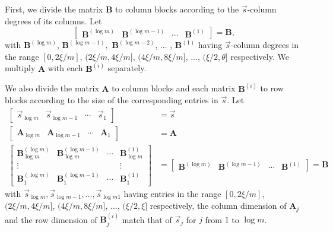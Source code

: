 \begin{pf}
First, we divide the matrix $\mathbf{B}$ to column blocks according
to the $\vec{s}$-column degrees of its columns. Let 
\[
\left[\begin{array}{cccc}
\mathbf{B}^{\left(\log m\right)} & \mathbf{B}^{\left(\log m-1\right)} & \cdots & \mathbf{B}^{\left(1\right)}\end{array}\right]=\mathbf{B},
\]
with $\mathbf{B}^{\left(\log m\right)}$, $\mathbf{B}^{\left(\log m-1\right)},$
$\mathbf{B}^{\left(\log m-2\right)}$, ... , $\mathbf{B}^{\left(1\right)}$
having $\vec{s}$-column degrees in the range $\left[0,2\xi/m\right]$,
$(2\xi/m,4\xi/m]$, $(4\xi/m,8\xi/m]$, ..., $(\xi/2,\theta]$ respectively.
We multiply $\mathbf{A}$ with each $\mathbf{B}^{\left(i\right)}$
separately. 

We also divide the matrix $\mathbf{A}$ to column blocks and each
matrix $\mathbf{B}^{\left(i\right)}$ to row blocks according to the
size of the corresponding entries in $\vec{s}$. Let 
\begin{align*}
\left[\begin{array}{cccc}
\vec{s}_{\log m} & \vec{s}_{\log m-1} & \cdots & \vec{s}_{1}\end{array}\right] & =\vec{s}\\
\left[\begin{array}{cccc}
\mathbf{A}_{\log m} & \mathbf{A}_{\log m-1} & \cdots & \mathbf{A}_{1}\end{array}\right] & =\mathbf{A}\\
\left[\begin{array}{cccc}
\mathbf{B}_{\log m}^{\left(\log m\right)} & \mathbf{B}_{\log m}^{\left(\log m-1\right)} & \cdots & \mathbf{B}_{\log m}^{\left(1\right)}\\
\vdots &  &  & \vdots\\
\mathbf{B}_{1}^{\left(\log m\right)} & \mathbf{B}_{1}^{\left(\log m-1\right)} & \cdots & \mathbf{B}_{1}^{\left(1\right)}
\end{array}\right] & =\left[\begin{array}{cccc}
\mathbf{B}^{\left(\log m\right)} & \mathbf{B}^{\left(\log m-1\right)} & \cdots & \mathbf{B}^{\left(1\right)}\end{array}\right]=\mathbf{B}
\end{align*}
 with $\vec{s}_{\log m},\vec{s}_{\log m-1},\dots,\vec{s}_{\log m1}$
having entries in the range $\left[0,2\xi/m\right]$, $(2\xi/m,4\xi/m]$,
$(4\xi/m,8\xi/m]$, ..., $(\xi/2,\xi]$ respectively, the column dimension
of $\mathbf{A}_{j}$ and the row dimension of $\mathbf{B}_{j}^{\left(i\right)}$
match that of $\vec{s}_{j}$ for $j$ from $1$ to $\log m$.


\end{pf}
